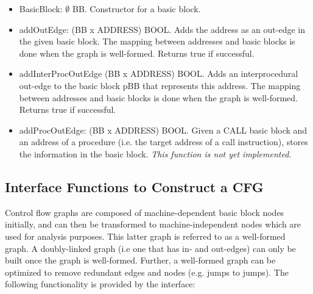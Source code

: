 \begin{itemize}
\item BasicBlock: $\emptyset$ \ra BB.
    Constructor for a basic block.

\item addOutEdge: (BB x ADDRESS) \ra BOOL.  
    Adds the address as an out-edge in the given basic block. 
    The mapping between addresses and basic blocks is done when 
    the graph is well-formed.
    Returns true if successful.

\item addInterProcOutEdge (BB x ADDRESS) \ra BOOL.
    Adds an interprocedural out-edge to the basic block pBB that
    represents this address.  The mapping between addresses and
    basic blocks is done when the graph is well-formed.
    Returns true if successful.

\item addProcOutEdge: (BB x ADDRESS) \ra BOOL.
    Given a CALL basic block and an address of a procedure (i.e. the
    target address of a call instruction), stores the information
    in the basic block. 
    \emph{This function is not yet implemented.}
\end{itemize}


\subsection{Interface Functions to Construct a CFG}
\label{sec-ir-cfg}
Control flow graphs are composed of machine-dependent basic block nodes 
initially, and can then be transformed to machine-independent nodes
which are used for analysis purposes.  This latter graph is referred
to as a well-formed graph. 
A doubly-linked graph (i.e one that has in- and out-edges) can only be 
built once the graph is well-formed.
Further, a well-formed graph can be optimized to remove redundant edges 
and nodes (e.g. jumps to jumps).
The following functionality is provided by the interface:


